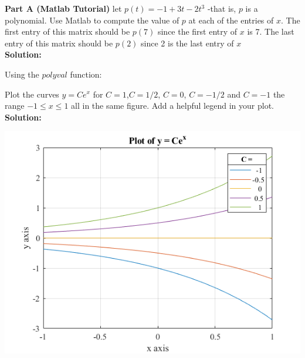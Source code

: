 \documentclass[12pt]{article}
\makeatletter
\theoremstyle{homework}
\newenvironment{exercise}[1]
{\def\@currentlabel{#1}\exercisecore}
{\endexercisecore}
\makeatother
\begin{document}
\textbf{Part A (Matlab Tutorial)}
\begin{exercise}{5}
let $p(t) = -1+3t-2t^3$ -that is, $p$ is a polynomial. Use Matlab to compute the value of $p$
at each of the entries of $x$. The first entry of this matrix should be $p(7)$ since the first entry of $x$ is 7. 
The last entry of this matrix should be $p(2)$ since 2 is the last entry of $x$ \\

\textbf{Solution:}

Using the $polyval$ function:

\end{exercise}

\vspace{1in}



\begin{exercise}{7} Plot the curves $y = Ce^x$ for $C = 1$,$C = 1/2$, $C = 0$, $C = -1/2$ and $C = -1$ 
  the range $-1 \leq x \leq 1$ all in the same figure. Add a helpful legend in your plot.\\

  \textbf{Solution:}
  
  \includegraphics[width=\textwidth]{ex7.png}

  
\end{exercise}

\vspace{1in}
\end{document}

